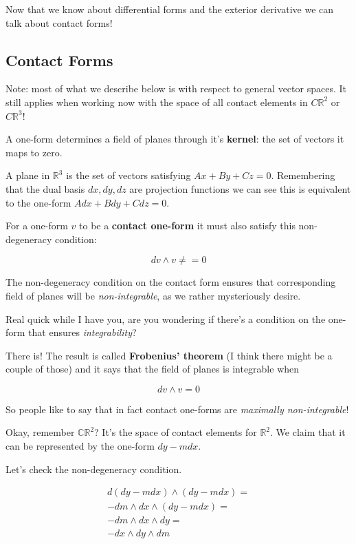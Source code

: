 \documentclass{article}
\begin{document}
Now that we know about differential forms and the exterior derivative we can
talk about contact forms!

\subsection {Contact Forms}

Note: most of what we describe below is with respect to general vector spaces.
It still applies when working now with the space of all contact elements in $C\mathbb{R}^{2}$ or
$C\mathbb{R}^{3}$! 

A one-form determines a field of planes through it's \textbf{kernel}: the set of
vectors it maps to zero.

A plane in $\mathbb{R}^{3}$ is the set of vectors satisfying $Ax + By + Cz = 0$.
Remembering that the dual basis $dx, dy, dz$ are projection functions we can see
this is equivalent to the one-form $Adx + Bdy + Cdz = 0$.

For a one-form $v$ to be a \textbf{contact one-form} it must also satisfy this
non-degeneracy condition:

\begin{equation}
  dv \wedge v \neq = 0
\end{equation}

The non-degeneracy condition on the contact form ensures that corresponding
field of planes will be \textit{non-integrable}, as we rather mysteriously
desire.

Real quick while I have you, are you wondering if there's a condition on the
one-form that ensures \textit{integrability}?

There is! The result is called \textbf{Frobenius' theorem} (I think there might
be a couple of those) and it says that the field of planes is integrable when

\begin{equation}
  dv \wedge v = 0
\end{equation}

So people like to say that in fact contact one-forms are \textit{maximally non-integrable}!

Okay, remember $\mathbb{CR}^{2}$? It's the space of contact elements for
$\mathbb{R}^2$. We claim that it can be represented by the one-form $dy - mdx$.

Let's check the non-degeneracy condition.

\begin{align*}
  d (dy - mdx) \wedge (dy - mdx) = \\
  -dm \wedge dx \wedge (dy - mdx) = \\
  -dm \wedge dx \wedge dy = \\
  -dx \wedge dy \wedge dm
\end{align*}
\end{document}
